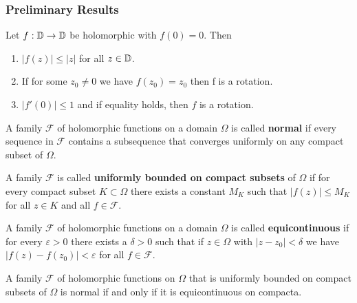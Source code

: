 \subsubsection{Preliminary Results}
\begin{lemma} \label{thm:SchwarzLemma}
    Let $f:\mathbb{D}\to\mathbb{D}$ be holomorphic with $f(0) = 0$. Then 
    \begin{enumerate}
    \item $|f(z)| \leq |z|$ for all $z \in \mathbb{D}$.
    \item If for some $z_0\neq 0$ we have $f(z_0)=z_0$ then f is a rotation.
    \item $|f'(0)| \leq 1$ and if equality holds, then $f$ is a rotation.
    \end{enumerate} 
\end{lemma}


\begin{definition} 
    A family $\mathcal{F}$ of holomorphic functions on a domain $\Omega$ is called \textbf{normal} if every sequence in $\mathcal{F}$ contains a subsequence that converges uniformly on any compact subset of $\Omega$.
\end{definition}    
\begin{definition} 
    A family $\mathcal{F}$ is called \textbf{uniformly bounded on compact subsets} of $\Omega$ if for every compact subset $K \subset \Omega$ there exists a constant $M_K$ such that $|f(z)| \leq M_K$ for all $z \in K$ and all $f \in \mathcal{F}$.
\end{definition}
\begin{definition} 
    A family $\mathcal{F}$ of holomorphic functions on a domain $\Omega$ is called \textbf{equicontinuous} if for every $\varepsilon > 0$ there exists a $\delta > 0$ such that if $z \in \Omega$ with $|z-z_0| < \delta$ we have $|f(z) - f(z_0)| < \varepsilon$ for all $f \in \mathcal{F}$.
\end{definition}
\begin{theorem}\label{thm:Montel}
    A family $\mathcal{F}$ of holomorphic functions on $\Omega$ that is uniformly bounded on compact subsets of $\Omega$ is normal if and only if it is equicontinuous on compacta.
\end{theorem}

